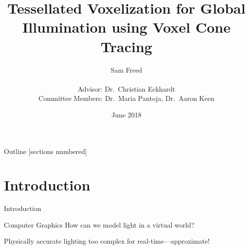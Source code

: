 \documentclass[10pt]{beamer}
\title{Tessellated Voxelization for Global Illumination using Voxel Cone Tracing}
\date{June 2018}
\author{Sam Freed\\\\Advisor: Dr.\ Christian Eckhardt\\Committee Members: Dr.\ Maria Pantoja, Dr.\ Aaron Keen\\}
\institute{California Polytechnic State University, San Luis Obispo}
\begin{document}
\frame{\titlepage}




\begin{frame}{Outline}
  [sections numbered]
  \tableofcontents[hideallsubsections]
\end{frame}


\section{Introduction}

\begin{frame}{Introduction}

  \begin{block}{Computer Graphics}
    How can we model light in a virtual world?

    Physically accurate lighting too complex for real-time---approximate!
  \end{block}
\end{frame}
\end{document}
